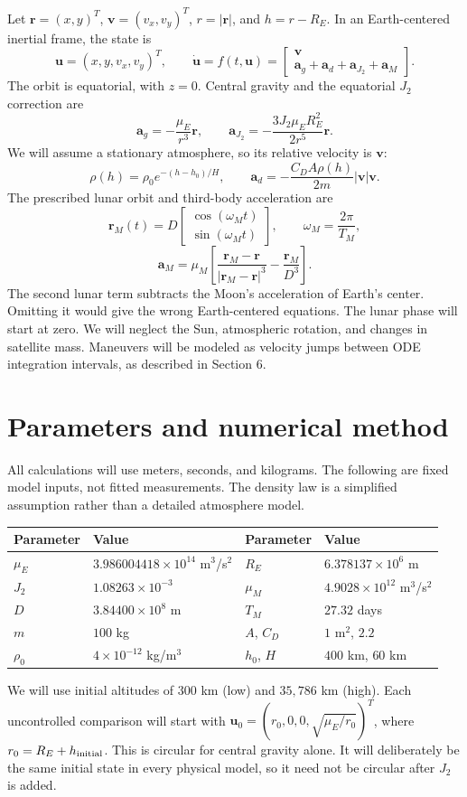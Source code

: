 \documentclass[11pt]{article}
\newcommand{\vect}[1]{\boldsymbol{#1}}
\begin{document}
Let $\vect r=(x,y)^T$, $\vect v=(v_x,v_y)^T$, $r=|\vect r|$, and $h=r-R_E$. In an Earth-centered inertial frame, the state is
\[
\vect u=(x,y,v_x,v_y)^T,\qquad
\dot{\vect u}=f(t,\vect u)=
\begin{bmatrix}\vect v\\\vect a_g+\vect a_d+\vect a_{J_2}+\vect a_M\end{bmatrix}.
\]
The orbit is equatorial, with $z=0$. Central gravity and the equatorial $J_2$ correction are
\[
\vect a_g=-\frac{\mu_E}{r^3}\vect r,\qquad
\vect a_{J_2}=-\frac{3J_2\mu_E R_E^2}{2r^5}\vect r.
\]
We will assume a stationary atmosphere, so its relative velocity is $\vect v$:
\[
\rho(h)=\rho_0 e^{-(h-h_0)/H},\qquad
\vect a_d=-\frac{C_D A\rho(h)}{2m}|\vect v|\vect v.
\]
The prescribed lunar orbit and third-body acceleration are
\[
\vect r_M(t)=D\begin{bmatrix}\cos(\omega_M t)\\\sin(\omega_M t)\end{bmatrix},
\qquad \omega_M=\frac{2\pi}{T_M},
\]
\[
\vect a_M=\mu_M\left[
\frac{\vect r_M-\vect r}{|\vect r_M-\vect r|^3}
-\frac{\vect r_M}{D^3}\right].
\]
The second lunar term subtracts the Moon's acceleration of Earth's center. Omitting it would give the wrong Earth-centered equations. The lunar phase will start at zero. We will neglect the Sun, atmospheric rotation, and changes in satellite mass. Maneuvers will be modeled as velocity jumps between ODE integration intervals, as described in Section 6.

\section{Parameters and numerical method}
All calculations will use meters, seconds, and kilograms. The following are fixed model inputs, not fitted measurements. The density law is a simplified assumption rather than a detailed atmosphere model.
\begin{center}
\begin{tabular}{ll@{\qquad}ll}
\toprule
Parameter & Value & Parameter & Value\\
\midrule
$\mu_E$ & $3.986004418\times10^{14}$ m$^3$/s$^2$ & $R_E$ & $6.378137\times10^6$ m\\
$J_2$ & $1.08263\times10^{-3}$ & $\mu_M$ & $4.9028\times10^{12}$ m$^3$/s$^2$\\
$D$ & $3.84400\times10^8$ m & $T_M$ & $27.32$ days\\
$m$ & $100$ kg & $A$, $C_D$ & $1$ m$^2$, $2.2$\\
$\rho_0$ & $4\times10^{-12}$ kg/m$^3$ & $h_0$, $H$ & $400$ km, $60$ km\\
\bottomrule
\end{tabular}
\end{center}
We will use initial altitudes of $300$ km (low) and $35{,}786$ km (high). Each uncontrolled comparison will start with $\vect u_0=(r_0,0,0,\sqrt{\mu_E/r_0})^T$, where $r_0=R_E+h_{\rm initial}$. This is circular for central gravity alone. It will deliberately be the same initial state in every physical model, so it need not be circular after $J_2$ is added.
\end{document}
